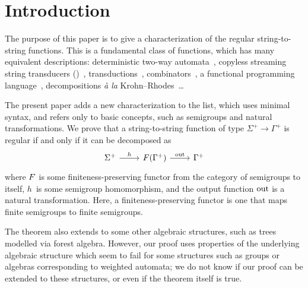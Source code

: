 \section{Introduction}
\label{sec:intro}

The purpose of this paper is to give a characterization of the regular string-to-string functions. This is a fundamental class of functions, which has many equivalent descriptions: deterministic two-way automata~\cite[Note~4]{shepherdson1959reduction}, copyless streaming string transducers (\sst)~\cite[Section~3]{alurExpressivenessStreamingString2010}, \mso transductions~\cite[Theorem~13]{engelfrietMSODefinableString2001}, combinators~\cite[Section~2]{alur2014regular}, a functional programming language~\cite[Section~6]{bojanczykRegularFirstOrderList2018}, decompositions \textit{à la} Krohn--Rhodes~\cite[Theorem~18, item~4]{bojanczykstefanski2020}\ldots


The present paper adds a new characterization to the list, which uses minimal syntax, and refers only to basic concepts, such as semigroups and natural transformations. We prove that a string-to-string function of type $\Sigma^+ \to \Gamma^+$ is regular
if and only if it can be decomposed as 
\[
\begin{tikzcd}
    \Sigma^+ 
    \ar[r,"h"]
    & 
    \functor(\Gamma^+)
    \ar[r,"\outfun"]
    &
    \Gamma^+
\end{tikzcd}
\]
where $\functor$ is some finiteness-preserving functor from the category of semigroups to itself, $h$~is some semigroup homomorphism, and the output function $\mathrm{out}$ is a natural transformation. Here, a finiteness-preserving functor is one that maps finite semigroups to finite semigroups. 


The theorem also extends to some other algebraic structures, such as trees modelled via forest algebra. However, our proof uses properties of the underlying algebraic structure which seem to fail for some structures such as groups or algebras corresponding to weighted automata; we do not know if our proof can be extended to  these structures, or even if the theorem itself is true.

